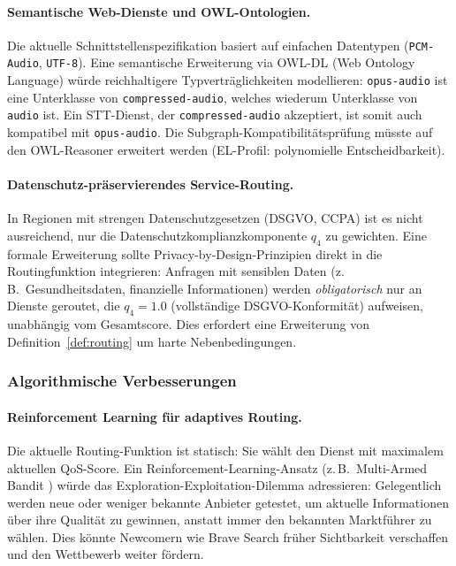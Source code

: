 ﻿\documentclass[a4paper,12pt]{article}
\theoremstyle{definition}
\begin{document}
\paragraph{Semantische Web-Dienste und OWL-Ontologien.}
Die aktuelle Schnittstellenspezifikation basiert auf einfachen Datentypen (\texttt{PCM-Audio}, \texttt{UTF-8}). Eine semantische Erweiterung via OWL-DL (Web Ontology Language) \cite{mcguinness2004} würde reichhaltigere Typverträglichkeiten modellieren: \texttt{opus-audio} ist eine Unterklasse von \texttt{compressed-audio}, welches wiederum Unterklasse von \texttt{audio} ist. Ein STT-Dienst, der \texttt{compressed-audio} akzeptiert, ist somit auch kompatibel mit \texttt{opus-audio}. Die Subgraph-Kompatibilitätsprüfung müsste auf den OWL-Reasoner erweitert werden (EL-Profil: polynomielle Entscheidbarkeit).

\paragraph{Datenschutz-präservierendes Service-Routing.}
In Regionen mit strengen Datenschutzgesetzen (DSGVO, CCPA) ist es nicht ausreichend, nur die Datenschutzkomplianzkomponente $q_4$ zu gewichten. Eine formale Erweiterung sollte Privacy-by-Design-Prinzipien \cite{cavoukian2009} direkt in die Routingfunktion integrieren: Anfragen mit sensiblen Daten (z.\,B.\ Gesundheitsdaten, finanzielle Informationen) werden \emph{obligatorisch} nur an Dienste geroutet, die $q_4 = 1.0$ (vollständige DSGVO-Konformität) aufweisen, unabhängig vom Gesamtscore. Dies erfordert eine Erweiterung von Definition~\ref{def:routing} um harte Nebenbedingungen.

\subsubsection{Algorithmische Verbesserungen}

\paragraph{Reinforcement Learning für adaptives Routing.}
Die aktuelle Routing-Funktion ist statisch: Sie wählt den Dienst mit maximalem aktuellen QoS-Score. Ein Reinforcement-Learning-Ansatz (z.\,B.\ Multi-Armed Bandit \cite{auer2002}) würde das Exploration-Exploitation-Dilemma adressieren: Gelegentlich werden neue oder weniger bekannte Anbieter getestet, um aktuelle Informationen über ihre Qualität zu gewinnen, anstatt immer den bekannten Marktführer zu wählen. Dies könnte Newcomern wie Brave Search früher Sichtbarkeit verschaffen und den Wettbewerb weiter fördern.
\end{document}

